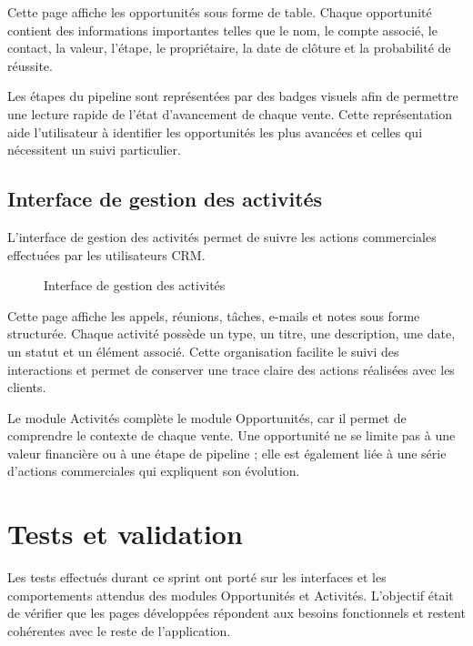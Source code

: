 \documentclass[12pt,a4paper]{report}
\begin{document}
Cette page affiche les opportunités sous forme de table. Chaque opportunité contient des informations importantes telles que le nom, le compte associé, le contact, la valeur, l’étape, le propriétaire, la date de clôture et la probabilité de réussite.

Les étapes du pipeline sont représentées par des badges visuels afin de permettre une lecture rapide de l’état d’avancement de chaque vente. Cette représentation aide l’utilisateur à identifier les opportunités les plus avancées et celles qui nécessitent un suivi particulier.

\subsection{Interface de gestion des activités}

L’interface de gestion des activités permet de suivre les actions commerciales effectuées par les utilisateurs CRM.

\begin{figure}[h]
    \centering
    \caption{Interface de gestion des activités}
    \label{fig:interface_activities}
\end{figure}

Cette page affiche les appels, réunions, tâches, e-mails et notes sous forme structurée. Chaque activité possède un type, un titre, une description, une date, un statut et un élément associé. Cette organisation facilite le suivi des interactions et permet de conserver une trace claire des actions réalisées avec les clients.

Le module Activités complète le module Opportunités, car il permet de comprendre le contexte de chaque vente. Une opportunité ne se limite pas à une valeur financière ou à une étape de pipeline ; elle est également liée à une série d’actions commerciales qui expliquent son évolution.

\section{Tests et validation}

Les tests effectués durant ce sprint ont porté sur les interfaces et les comportements attendus des modules Opportunités et Activités. L’objectif était de vérifier que les pages développées répondent aux besoins fonctionnels et restent cohérentes avec le reste de l’application.
\end{document}
